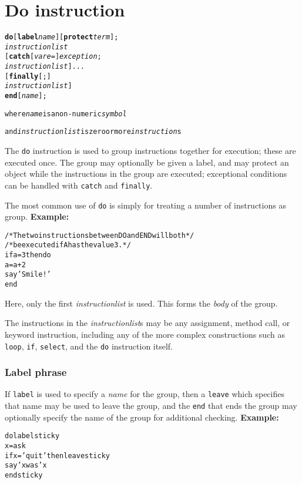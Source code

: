 \chapter{Do instruction}\label{refdo}
\index{,}
\index{,}
\index{,}
\begin{shaded}
\begin{alltt}
\textbf{do} [\textbf{label} \emph{name}] [\textbf{protect} \emph{term}];
        \emph{instructionlist}
    [\textbf{catch} [\emph{vare} =] \emph{exception};
        \emph{instructionlist}]...
    [\textbf{finally}[;]
        \emph{instructionlist}]
    \textbf{end} [\emph{name}];

where \emph{name} is a non-numeric \emph{symbol}

and \emph{instructionlist} is zero or more \emph{instruction}s
\end{alltt}
\end{shaded}
 The \texttt{do} instruction is used to group instructions together for
execution; these are executed once.
The group may optionally be given a label, and may protect an object
while the instructions in the group are executed; exceptional conditions
can be handled with \texttt{catch} and \texttt{finally}.
 
The most common use of \texttt{do} is simply for treating a number of
instructions as group.
 \textbf{Example:}
\begin{alltt}
/* The two instructions between DO and END will both */
/* be executed if A has the value 3.                 */
if a=3 then do
  a=a+2
  say 'Smile!'
  end
\end{alltt}
Here, only the first \emph{instructionlist} is used.
This forms the \emph{body} of the group.
 
The instructions in the \emph{instructionlist}s may be any assignment,
method call, or keyword instruction, including any of the more complex
constructions such as \texttt{loop}, \texttt{if}, \texttt{select}, and
the \texttt{do} instruction itself.
\subsection{Label phrase}
 
If \texttt{label} is used to specify a \emph{name} for the group,
then a \texttt{leave} which specifies that name may be used to leave the
group, and the \texttt{end} that ends the group may optionally specify
the name of the group for additional checking.
 \textbf{Example:}
\begin{alltt}
do label sticky
  x=ask
  if x='quit' then leave sticky
  say 'x was' x
  end sticky
\end{alltt}
